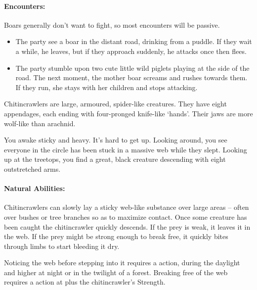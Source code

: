 \begin{multicols}{2}
\paragraph{Encounters:} Boars generally don't want to fight, so most encounters will be passive.

\begin{itemize}

  \item
  The party see a boar in the distant road, drinking from a puddle.
  If they wait a while, he leaves, but if they approach suddenly, he attacks once then flees.
  \item
  The party stumble upon two cute little wild piglets playing at the side of the road.
  The next moment, the mother boar screams and rushes towards them.
  If they run, she stays with her children and stops attacking.

\end{itemize}


\label{chitincrawler}

Chitincrawlers are large, armoured, spider-like creatures.
They have eight appendages, each ending with four-pronged knife-like `hands'.
Their jaws are more wolf-like than arachnid.

\chitincrawler

\begin{boxtext}

You awake sticky and heavy.
It's hard to get up.
Looking around, you see everyone in the circle has been stuck in a massive web while they slept.
Looking up at the treetops, you find a great, black creature descending with eight outstretched arms.

\end{boxtext}

\paragraph{Natural Abilities:} Chitincrawlers can slowly lay a sticky web-like substance over large areas -- often over bushes or tree branches so as to maximize contact.
Once some creature has been caught the chitincrawler quickly descends.
If the prey is weak, it leaves it in the web.
If the prey might be strong enough to break free, it quickly bites through limbs to start bleeding it dry.

Noticing the web before stepping into it requires a  action, \tn[7] during the daylight and higher at night or in the twilight of a forest.
Breaking free of the web requires a  action at \tn[7] plus the chitincrawler's Strength.


\end{multicols}
